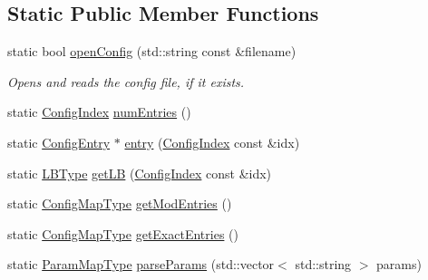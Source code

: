 \subsection*{Static Public Member Functions}
\begin{DoxyCompactItemize}
\item 
static bool \hyperlink{structvt_1_1vrt_1_1collection_1_1balance_1_1_read_l_b_config_a9fcbc87eb60d33c0e7d0cb363b8fdbb0}{open\+Config} (std\+::string const \&filename)
\begin{DoxyCompactList}\small\item\em Opens and reads the config file, if it exists. \end{DoxyCompactList}\item 
static \hyperlink{namespacevt_1_1vrt_1_1collection_1_1balance_ac1bb9eee8129549177880dbb4e5f6a34}{Config\+Index} \hyperlink{structvt_1_1vrt_1_1collection_1_1balance_1_1_read_l_b_config_aa16f51d2a1b0d3adc7ca6fa907231414}{num\+Entries} ()
\item 
static \hyperlink{structvt_1_1vrt_1_1collection_1_1balance_1_1_config_entry}{Config\+Entry} $\ast$ \hyperlink{structvt_1_1vrt_1_1collection_1_1balance_1_1_read_l_b_config_a2811ea4fc680cc4dfe94d8c9160f7514}{entry} (\hyperlink{namespacevt_1_1vrt_1_1collection_1_1balance_ac1bb9eee8129549177880dbb4e5f6a34}{Config\+Index} const \&idx)
\item 
static \hyperlink{namespacevt_1_1vrt_1_1collection_1_1balance_ac4f99693509affcc67db182d4aad9b5c}{L\+B\+Type} \hyperlink{structvt_1_1vrt_1_1collection_1_1balance_1_1_read_l_b_config_ad1cf6d87a102700f5f0546265f31de8e}{get\+LB} (\hyperlink{namespacevt_1_1vrt_1_1collection_1_1balance_ac1bb9eee8129549177880dbb4e5f6a34}{Config\+Index} const \&idx)
\item 
static \hyperlink{structvt_1_1vrt_1_1collection_1_1balance_1_1_read_l_b_config_ad7babe539cf2171b9a9cee642b36a965}{Config\+Map\+Type} \hyperlink{structvt_1_1vrt_1_1collection_1_1balance_1_1_read_l_b_config_ae7041ee267d22fe1fa9c7518f9d3eb98}{get\+Mod\+Entries} ()
\item 
static \hyperlink{structvt_1_1vrt_1_1collection_1_1balance_1_1_read_l_b_config_ad7babe539cf2171b9a9cee642b36a965}{Config\+Map\+Type} \hyperlink{structvt_1_1vrt_1_1collection_1_1balance_1_1_read_l_b_config_a5e32057d53bfad17ba659a57b810c559}{get\+Exact\+Entries} ()
\item 
static \hyperlink{structvt_1_1vrt_1_1collection_1_1balance_1_1_read_l_b_config_a539bba2e8e767f2aa9923c6616088404}{Param\+Map\+Type} \hyperlink{structvt_1_1vrt_1_1collection_1_1balance_1_1_read_l_b_config_a815d255cc8ca02dd7ead153b9dc20623}{parse\+Params} (std\+::vector$<$ std\+::string $>$ params)

\end{DoxyCompactItemize}
